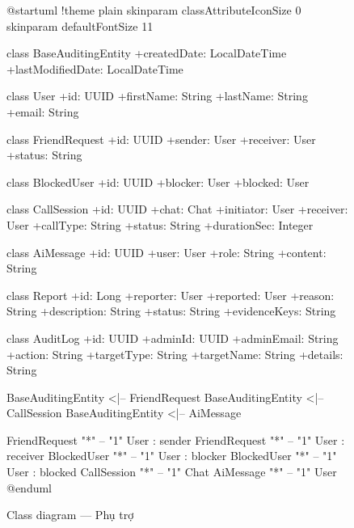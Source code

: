 \documentclass[12pt,a4paper]{report}
\begin{document}
\begin{figure}[H]
    \centering
    \begin{plantuml}
        @startuml
        !theme plain
        skinparam classAttributeIconSize 0
        skinparam defaultFontSize 11

        class BaseAuditingEntity {
            +createdDate: LocalDateTime
            +lastModifiedDate: LocalDateTime
        }

        class User {
            +id: UUID
            +firstName: String
            +lastName: String
            +email: String
        }

        class FriendRequest {
            +id: UUID
            +sender: User
            +receiver: User
            +status: String
        }

        class BlockedUser {
            +id: UUID
            +blocker: User
            +blocked: User
        }

        class CallSession {
            +id: UUID
            +chat: Chat
            +initiator: User
            +receiver: User
            +callType: String
            +status: String
            +durationSec: Integer
        }

        class AiMessage {
            +id: UUID
            +user: User
            +role: String
            +content: String
        }

        class Report {
            +id: Long
            +reporter: User
            +reported: User
            +reason: String
            +description: String
            +status: String
            +evidenceKeys: String
        }

        class AuditLog {
            +id: UUID
            +adminId: UUID
            +adminEmail: String
            +action: String
            +targetType: String
            +targetName: String
            +details: String
        }

        BaseAuditingEntity <|-- FriendRequest
        BaseAuditingEntity <|-- CallSession
        BaseAuditingEntity <|-- AiMessage

        FriendRequest "*" -- "1" User : sender
        FriendRequest "*" -- "1" User : receiver
        BlockedUser "*" -- "1" User : blocker
        BlockedUser "*" -- "1" User : blocked
        CallSession "*" -- "1" Chat
        AiMessage "*" -- "1" User
        @enduml
    \end{plantuml}
    \caption{Class diagram --- Phụ trợ}
\end{figure}
\end{document}
